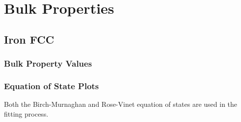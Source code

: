 \clearpage
\section{Bulk Properties}


\FloatBarrier
\subsection{Iron FCC}

\subsubsection{Bulk Property Values}





\subsubsection{Equation of State Plots}

Both the Birch-Murnaghan and Rose-Vinet equation of states are used in the fitting process.

